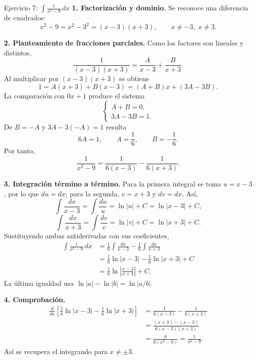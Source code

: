 \begin{examplebox}{Ejercicio 7: $\displaystyle \int\frac{1}{x^2-9}\,dx$}
\textbf{1. Factorización y dominio.} Se reconoce una diferencia de cuadrados:
\[
 x^2-9=x^2-3^2=(x-3)(x+3),
 \qquad x\ne-3,\;x\ne3.
\]

\textbf{2. Planteamiento de fracciones parciales.} Como los factores son lineales y distintos,
\[
 \frac{1}{(x-3)(x+3)}=\frac{A}{x-3}+\frac{B}{x+3}.
\]
Al multiplicar por $(x-3)(x+3)$ se obtiene
\[
 1=A(x+3)+B(x-3)=(A+B)x+(3A-3B).
\]
La comparación con $0x+1$ produce el sistema
\[
 \begin{cases}
 A+B=0,\\
 3A-3B=1.
 \end{cases}
\]
De $B=-A$ y $3A-3(-A)=1$ resulta
\[
 6A=1,\qquad A=\frac16,\qquad B=-\frac16.
\]
Por tanto,
\[
 \frac{1}{x^2-9}=\frac1{6(x-3)}-\frac1{6(x+3)}.
\]

\pagebreak
\textbf{3. Integración término a término.} Para la primera integral se toma $u=x-3$, por lo que $du=dx$; para la segunda, $v=x+3$ y $dv=dx$. Así,
\[
 \int\frac{dx}{x-3}=\int\frac{du}{u}
 =\ln|u|+C=\ln|x-3|+C,
\]
\[
 \int\frac{dx}{x+3}=\int\frac{dv}{v}
 =\ln|v|+C=\ln|x+3|+C.
\]
Sustituyendo ambas antiderivadas con sus coeficientes,
\begin{align*}
 \int\frac{1}{x^2-9}\,dx
 &=\frac16\int\frac{dx}{x-3}-\frac16\int\frac{dx}{x+3}\\
 &=\frac16\ln|x-3|-\frac16\ln|x+3|+C\\
 &=\boxed{\frac16\ln\left|\frac{x-3}{x+3}\right|+C}.
\end{align*}
La última igualdad usa $\ln|a|-\ln|b|=\ln|a/b|$.

\textbf{4. Comprobación.}
\begin{align*}
 \frac{d}{dx}\left[\frac16\ln|x-3|-\frac16\ln|x+3|\right]
 &=\frac1{6(x-3)}-\frac1{6(x+3)}\\
 &=\frac{(x+3)-(x-3)}{6(x-3)(x+3)}\\
 &=\frac6{6(x^2-9)}=\frac1{x^2-9}.
\end{align*}
Así se recupera el integrando para $x\ne\pm3$.
\end{examplebox}

